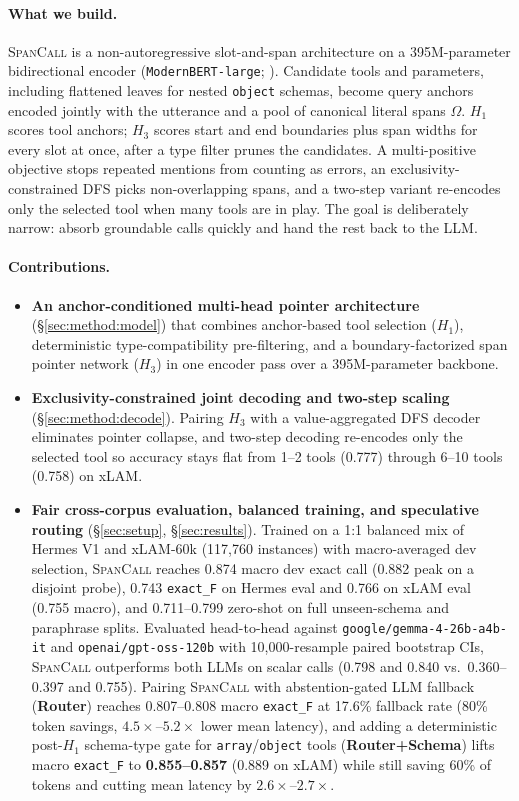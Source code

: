 \paragraph{What we build.}
\textsc{SpanCall} is a non-autoregressive slot-and-span architecture on a 395M-parameter bidirectional encoder (\texttt{ModernBERT-large}; \citealp{warner2024modernbert}). Candidate tools and parameters, including flattened leaves for nested \texttt{object} schemas, become query anchors encoded jointly with the utterance and a pool of canonical literal spans $\Omega$. $H_1$ scores tool anchors; $H_3$ scores start and end boundaries plus span widths for every slot at once, after a type filter prunes the candidates. A multi-positive objective stops repeated mentions from counting as errors, an exclusivity-constrained DFS picks non-overlapping spans, and a two-step variant re-encodes only the selected tool when many tools are in play. The goal is deliberately narrow: absorb groundable calls quickly and hand the rest back to the LLM.

\paragraph{Contributions.}
\begin{itemize}
    \item \textbf{An anchor-conditioned multi-head pointer architecture} (\S\ref{sec:method:model}) that combines anchor-based tool selection ($H_1$), deterministic type-compatibility pre-filtering, and a boundary-factorized span pointer network ($H_3$) in one encoder pass over a 395M-parameter backbone.
    \item \textbf{Exclusivity-constrained joint decoding and two-step scaling} (\S\ref{sec:method:decode}). Pairing $H_3$ with a value-aggregated DFS decoder eliminates pointer collapse, and two-step decoding re-encodes only the selected tool so accuracy stays flat from 1--2 tools (0.777) through 6--10 tools (0.758) on xLAM.
    \item \textbf{Fair cross-corpus evaluation, balanced training, and speculative routing} (\S\ref{sec:setup}, \S\ref{sec:results}). Trained on a 1:1 balanced mix of Hermes V1 and xLAM-60k (117,760 instances) with macro-averaged dev selection, \textsc{SpanCall} reaches 0.874 macro dev exact call (0.882 peak on a disjoint probe), 0.743 \texttt{exact\_F} on Hermes eval and 0.766 on xLAM eval (0.755 macro), and 0.711--0.799 zero-shot on full unseen-schema and paraphrase splits. Evaluated head-to-head against \texttt{google/gemma-4-26b-a4b-it} and \texttt{openai/gpt-oss-120b} with 10,000-resample paired bootstrap CIs, \textsc{SpanCall} outperforms both LLMs on scalar calls (0.798 and 0.840 vs.\ 0.360--0.397 and 0.755). Pairing \textsc{SpanCall} with abstention-gated LLM fallback (\textbf{Router}) reaches 0.807--0.808 macro \texttt{exact\_F} at 17.6\% fallback rate (80\% token savings, $4.5\times$--$5.2\times$ lower mean latency), and adding a deterministic post-$H_1$ schema-type gate for \texttt{array}/\texttt{object} tools (\textbf{Router+Schema}) lifts macro \texttt{exact\_F} to \textbf{0.855--0.857} (0.889 on xLAM) while still saving 60\% of tokens and cutting mean latency by $2.6\times$--$2.7\times$.
\end{itemize}
